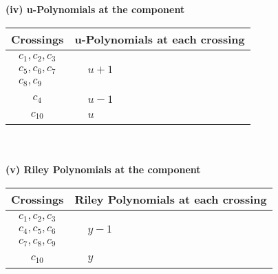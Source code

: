 \documentclass[1p]{elsarticle_modified}
\theoremstyle{definition}
\begin{document}
\newpage\renewcommand{\arraystretch}{1}
\flushleft \textbf{(iv) u-Polynomials at the component}\newline \\
\begin{tabular}{m{50pt}|m{274pt}}
Crossings & \hspace{64pt}u-Polynomials at each crossing \\
\hline $$\begin{aligned}c_{1},c_{2},c_{3}\\c_{5},c_{6},c_{7}\\c_{8},c_{9}\end{aligned}$$&$\begin{aligned}
&u+1
\end{aligned}$\\
\hline $$\begin{aligned}c_{4}\end{aligned}$$&$\begin{aligned}
&u-1
\end{aligned}$\\
\hline $$\begin{aligned}c_{10}\end{aligned}$$&$\begin{aligned}
&u
\end{aligned}$\\
\hline
\end{tabular}\\~\\
\newpage\renewcommand{\arraystretch}{1}
\flushleft \textbf{(v) Riley Polynomials at the component}\newline \\
\begin{tabular}{m{50pt}|m{274pt}}
Crossings & \hspace{64pt}Riley Polynomials at each crossing \\
\hline $$\begin{aligned}c_{1},c_{2},c_{3}\\c_{4},c_{5},c_{6}\\c_{7},c_{8},c_{9}\end{aligned}$$&$\begin{aligned}
&y-1
\end{aligned}$\\
\hline $$\begin{aligned}c_{10}\end{aligned}$$&$\begin{aligned}
&y
\end{aligned}$\\
\hline
\end{tabular}\\~\\
\end{document}
